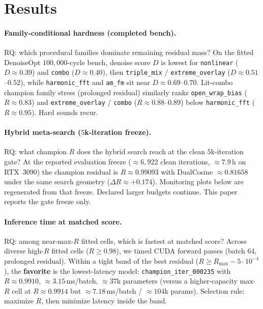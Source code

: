 \section{Results}
\label{sec:results}

\paragraph{Family-conditional hardness (completed bench).}
RQ: which procedural families dominate remaining residual mass?
On the fitted DenoiseOpt $100{,}000$-cycle bench, denoise score $D$ is lowest for \texttt{nonlinear} ($D\approx 0.39$) and \texttt{combo} ($D\approx 0.40$), then \texttt{triple\_mix} / \texttt{extreme\_overlay} ($D\approx 0.51$--$0.52$), while \texttt{harmonic\_fft} and \texttt{am\_fm} sit near $D\approx 0.69$--$0.70$.
Lit-combo champion family stress (prolonged residual) similarly ranks \texttt{open\_wrap\_bias} ($R\approx 0.83$) and \texttt{extreme\_overlay} / \texttt{combo} ($R\approx 0.88$--$0.89$) below \texttt{harmonic\_fft} ($R\approx 0.95$).
Hard sounds recur.

\paragraph{Hybrid meta-search ($5$k-iteration freeze).}
RQ: what champion $R$ does the hybrid search reach at the clean $5$k-iteration gate?
At the reported evaluation freeze ($\approx 6{,}922$ clean iterations, $\approx 7.9$\,h on RTX~3090) the champion residual is $R\approx 0.99093$ with DualCosine $\approx 0.81658$ under the same search geometry ($\Delta R\approx{+}0.174$).
Monitoring plots below are regenerated from that freeze.
Declared larger budgets continue. This paper reports the gate freeze only.

\paragraph{Inference time at matched score.}
RQ: among near-max-$R$ fitted cells, which is fastest at matched score?
Across diverse high-$R$ fitted cells ($R\ge 0.98$), we timed CUDA forward passes (batch 64, prolonged residual).
Within a tight band of the best residual ($R \ge R_{\max}-5\cdot10^{-4}$), the \textbf{favorite} is the lowest-latency model:
\texttt{champion\_iter\_000235} with $R\approx 0.9910$, $\approx 3.15$\,ms/batch, $\approx 37$k parameters
(versus a higher-capacity max-$R$ cell at $R\approx 0.9914$ but $\approx 7.18$\,ms/batch / $\approx 104$k params).
Selection rule: maximize $R$, then minimize latency inside the band.

